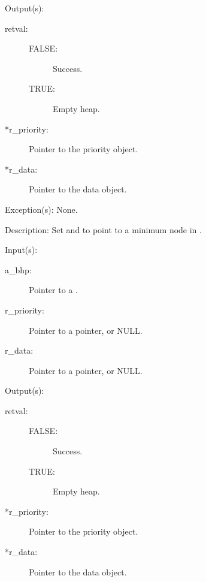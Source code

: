 \begin{capi}
\begin{capilist}
\begin{description}
		\end{description}
	\item[Output(s): ]
		\begin{description}\item[]
		\item[retval: ]
			\begin{description}\item[]
			\item[FALSE: ] Success.
			\item[TRUE: ] Empty heap.
			\end{description}
		\item[*r\_priority: ]
			Pointer to the priority object.
		\item[*r\_data: ]
			Pointer to the data object.
		\end{description}
	\item[Exception(s): ] None.
	\item[Description: ]
		Set  and  to point to a
		minimum node in .
	\end{capilist}
\label{bhp_min_del}
	\begin{capilist}
	\item[Input(s): ]
		\begin{description}\item[]
		\item[a\_bhp: ]
			Pointer to a .
		\item[r\_priority: ]
			Pointer to a pointer, or NULL.
		\item[r\_data: ]
			Pointer to a pointer, or NULL.
		\end{description}
	\item[Output(s): ]
		\begin{description}\item[]
		\item[retval: ]
			\begin{description}\item[]
			\item[FALSE: ] Success.
			\item[TRUE: ] Empty heap.
			\end{description}
		\item[*r\_priority: ]
			Pointer to the priority object.
		\item[*r\_data: ]
			Pointer to the data object.
		\end{description}

\end{capilist}
\end{capi}
